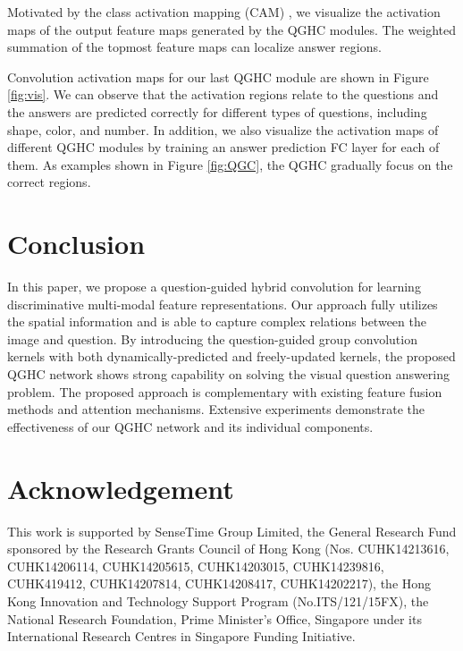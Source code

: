 \documentclass[runningheads]{llncs}
\begin{document}
Motivated by the class activation mapping (CAM) \cite{zhou2015simple}, we visualize the activation maps of the output feature maps generated by the QGHC modules. The weighted summation of the topmost feature maps can localize answer regions.

Convolution activation maps for our last QGHC module are shown in Figure \ref{fig:vis}. We can observe that the activation regions relate to the questions and the answers are predicted correctly for different types of questions, including shape, color, and number. In addition, we also visualize the activation maps of different QGHC modules by training an answer prediction FC layer for each of them.
As examples shown in Figure \ref{fig:QGC}, the QGHC gradually focus on the correct regions.

\section{Conclusion}
\label{sec:conclusion}

In this paper, we propose a question-guided hybrid convolution for learning discriminative multi-modal feature representations. Our approach fully utilizes the spatial information and is able to capture complex relations between the image and question. By introducing the question-guided group convolution kernels with both dynamically-predicted and freely-updated kernels, the proposed QGHC network shows strong capability on solving the visual question answering problem. The proposed approach is complementary with existing feature fusion methods and attention mechanisms. Extensive experiments demonstrate the effectiveness of our QGHC network and its individual components.


\section{Acknowledgement}
This work is supported by SenseTime Group Limited, the General Research Fund sponsored by the Research Grants Council of Hong Kong (Nos. CUHK14213616, CUHK14206114, CUHK14205615, CUHK14203015, CUHK14239816, CUHK419412, CUHK14207814, CUHK14208417, CUHK14202217), the Hong Kong Innovation and Technology Support Program (No.ITS/121/15FX), the National Research Foundation, Prime Minister's Office, Singapore under its International Research Centres in Singapore Funding Initiative.
\end{document}
